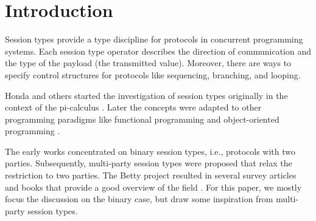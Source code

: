 \documentclass[acmsmall,screen,anonymous,review]{acmart}
\begin{document}



\maketitle

\section{Introduction}
\label{sec:introduction}



Session types provide a type discipline for protocols
in concurrent programming systems. Each session type operator
describes the direction of communication and the type of the
payload (the transmitted value). Moreover, there are ways to specify
control structures for protocols like sequencing, branching, and
looping.

Honda and others
\cite{DBLP:conf/concur/Honda93,DBLP:conf/parle/TakeuchiHK94,DBLP:conf/esop/HondaVK98}
started the investigation of session types originally in the context
of the pi-calculus \cite{DBLP:journals/iandc/MilnerPW92a}. Later the concepts were adapted to other programming
paradigms like functional programming
\cite{DBLP:journals/tcs/VasconcelosGR06,DBLP:journals/jfp/GayV10} and
object-oriented programming
\cite{DBLP:conf/europar/RavaraV97,DBLP:journals/corr/abs-1205-5344}. 

The early works concentrated on binary session types, i.e., protocols
with two parties. Subsequently, multi-party session types were
proposed \cite{DBLP:journals/jacm/HondaYC16} that relax the
restriction to two parties. The Betty project resulted in several survey articles
and books that provide a good overview of the field
\cite{gay17:_behav_types,DBLP:journals/csur/HuttelLVCCDMPRT16,DBLP:journals/jlp/BartolettiCDDGP15,DBLP:journals/ftpl/AnconaBB0CDGGGH16}. 
For this paper, we mostly focus the discussion on the binary case, but draw some
inspiration from multi-party session types.
\end{document}
